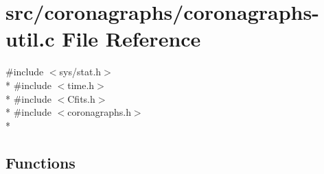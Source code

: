 \hypertarget{coronagraphs-util_8c}{\section{src/coronagraphs/coronagraphs-\/util.c File Reference}
\label{coronagraphs-util_8c}
}
{\ttfamily \#include $<$sys/stat.\+h$>$}\\*
{\ttfamily \#include $<$time.\+h$>$}\\*
{\ttfamily \#include $<$Cfits.\+h$>$}\\*
{\ttfamily \#include $<$coronagraphs.\+h$>$}\\*
\subsection*{Functions}
